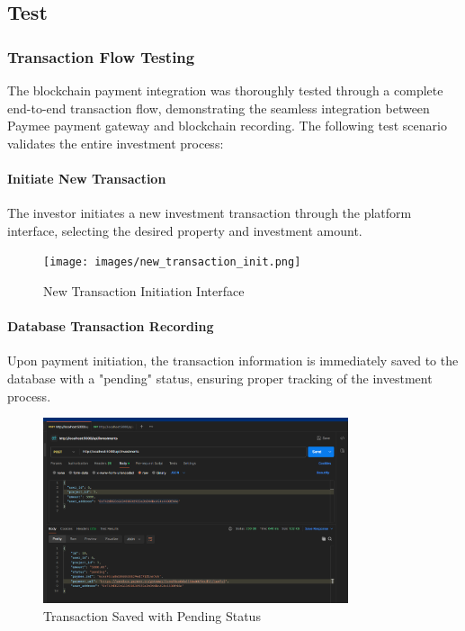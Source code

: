 \subsection{Test}
\subsubsection{Transaction Flow Testing}

The blockchain payment integration was thoroughly tested through a complete end-to-end transaction flow, demonstrating the seamless integration between Paymee payment gateway and blockchain recording. The following test scenario validates the entire investment process:

\paragraph{ Initiate New Transaction}
The investor initiates a new investment transaction through the platform interface, selecting the desired property and investment amount.

\begin{figure}[htbp]
    \centering
    \texttt{[image: images/new\_transaction\_init.png]}
    \caption{New Transaction Initiation Interface}
    \label{fig:new-transaction-init}
\end{figure}


\paragraph{ Database Transaction Recording}
Upon payment initiation, the transaction information is immediately saved to the database with a "pending" status, ensuring proper tracking of the investment process.

\begin{figure}[htbp]
    \centering
    \includegraphics[width=0.8\textwidth]{images/transaction_pending_status.png}
    \caption{Transaction Saved with Pending Status}
    \label{fig:transaction-pending-status}
\end{figure}

